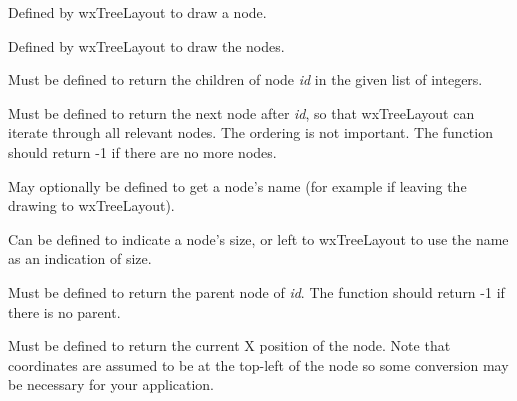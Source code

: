 Defined by wxTreeLayout to draw a node.



Defined by wxTreeLayout to draw the nodes.

\label{wxtreelayoutgetchildren}


Must be defined to return the children of node {\it id} in the given list
of integers.

\label{wxtreelayoutgetnextnode}


Must be defined to return the next node after {\it id}, so that wxTreeLayout can
iterate through all relevant nodes. The ordering is not important.
The function should return -1 if there are no more nodes.



May optionally be defined to get a node's name (for example if leaving
the drawing to wxTreeLayout).



Can be defined to indicate a node's size, or left to wxTreeLayout to use the
name as an indication of size.

\label{wxtreelayoutgetnodeparent}


Must be defined to return the parent node of {\it id}.
The function should return -1 if there is no parent.



Must be defined to return the current X position of the node. Note that
coordinates are assumed to be at the top-left of the node so some conversion
may be necessary for your application.


